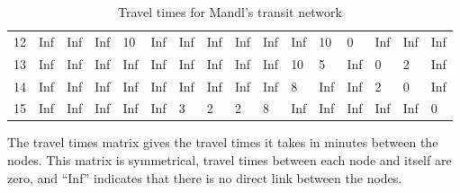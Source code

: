 \begin{table}[H]
{\begin{tabular}{|l|lllllllllllllll|}
    12 & Inf     & Inf      & Inf     & 10        & Inf      & Inf       & Inf      &  Inf     &  Inf     &  Inf     &  10     & 0           & Inf      & Inf       & Inf   \\
    13 & Inf     & Inf      & Inf     &  Inf      &  Inf     & Inf       &  Inf     &  Inf     &  Inf     & 10       &  5      & Inf         &  0       & 2         &  Inf  \\
    14 & Inf     & Inf      &  Inf    &  Inf      &  Inf     & Inf       &  Inf     & Inf      & Inf      & 8        &  Inf    &  Inf        & 2        & 0         &   Inf \\
    15 & Inf     & Inf      & Inf     & Inf       & Inf      & 3         &  2       &  2       & 8        & Inf      & Inf     &
     Inf         &  Inf     & Inf       &  0    \\
     \hline
    \end{tabular}
}
    \caption {Travel times for Mandl's transit network}
    \label{table:MandlTravelTimes}
    The travel times matrix gives the travel times it takes in minutes between the nodes. This matrix is symmetrical, travel times between each node and itself are zero, and ``Inf'' indicates that there is no direct link between the nodes.
\end{table}

